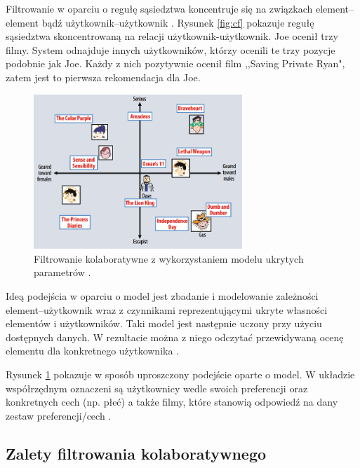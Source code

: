 \documentclass[twoside]{iisthesis}
\begin{document}
	 Filtrowanie w oparciu o regułę sąsiedztwa koncentruje się na związkach element--element bądź użytkownik--użytkownik \cite{id:AdvancesInCollaborativeFiltering}.
	 Rysunek \ref{fig:cf} pokazuje regułę sąsiedztwa skoncentrowaną na relacji użytkownik-użytkownik. Joe ocenił trzy filmy. System odnajduje innych użytkowników, którzy ocenili te trzy pozycje podobnie jak Joe. Każdy z nich pozytywnie ocenił film ,,Saving Private Ryan", zatem jest to pierwsza rekomendacja dla Joe. 
	 
	  \begin{figure}[!ht] 
	  	\centering
	  	\includegraphics[width=0.7\textwidth]{cf2}
	  	\caption{Filtrowanie kolaboratywne z wykorzystaniem modelu ukrytych parametrów \protect\cite{koren2009matrix}.}
	  	\label{fig:cf2}
	  \end{figure}
	 
	 Ideą podejścia w oparciu o model jest zbadanie i modelowanie zależności element--użytkownik wraz z czynnikami reprezentującymi ukryte własności elementów i użytkowników. Taki model jest następnie uczony przy użyciu dostępnych danych. W rezultacie można z niego odczytać przewidywaną ocenę elementu dla konkretnego użytkownika \cite{id:ComprehensiveSurveyOfNeighborhoodBasedRecommendationMethods, id:AdvancesInCollaborativeFiltering}.
	 
	 Rysunek \ref{fig:cf2} pokazuje w sposób uproszczony podejście oparte o model. W układzie współrzędnym oznaczeni są użytkownicy wedle swoich preferencji oraz konkretnych cech (np. płeć) a także filmy, które stanowią odpowiedź na dany zestaw preferencji/cech \cite{koren2009matrix}. 
	 
	 \subsection{Zalety filtrowania kolaboratywnego}
	 
\end{document}

